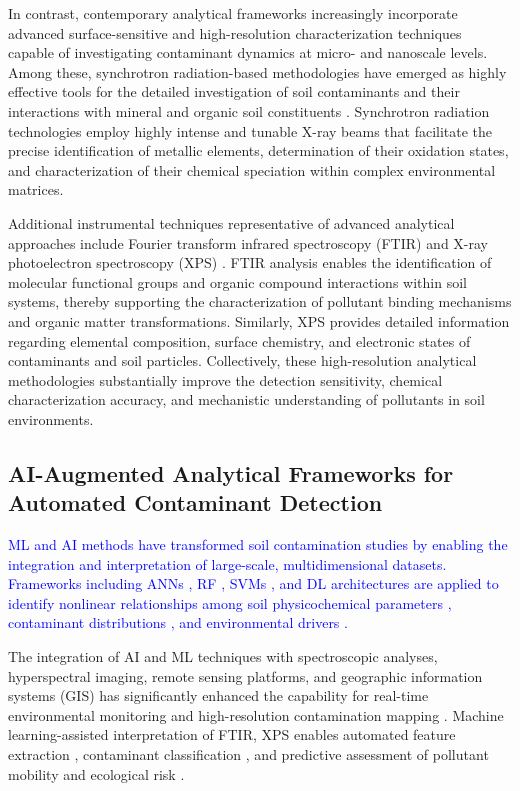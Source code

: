 \documentclass[environments,article,submit,pdftex,moreauthors]{Definitions/mdpi}
\begin{document}
In contrast, contemporary analytical frameworks increasingly incorporate
advanced surface-sensitive and high-resolution characterization techniques
capable of investigating contaminant dynamics at micro- and nanoscale levels.
Among these, synchrotron radiation-based methodologies have emerged as highly
effective tools for the detailed investigation of soil contaminants and their
interactions with mineral and organic soil constituents
\cite{Hu2020,Rosskopfova2012,LindhLemenkova2023a}. Synchrotron radiation
technologies employ highly intense and tunable X-ray beams that facilitate
the precise identification of metallic elements, determination of their
oxidation states, and characterization of their chemical speciation within
complex environmental matrices.

Additional instrumental techniques representative of advanced analytical
approaches include Fourier transform infrared spectroscopy (FTIR)
\cite{Xu2026} and X-ray photoelectron spectroscopy (XPS)
\cite{Guo2025,LindhLemenkova2023c}. FTIR analysis enables the identification
of molecular functional groups and organic compound interactions within soil
systems, thereby supporting the characterization of pollutant binding
mechanisms and organic matter transformations. Similarly, XPS provides
detailed information regarding elemental composition, surface chemistry, and
electronic states of contaminants and soil particles. Collectively, these
high-resolution analytical methodologies substantially improve the detection
sensitivity, chemical characterization accuracy, and mechanistic understanding
of pollutants in soil environments.

\subsection{AI-Augmented Analytical Frameworks for Automated Contaminant
    Detection}\label{sec3.2}

\textcolor{blue}{ML and AI methods have transformed soil contamination studies by enabling the integration and interpretation of large-scale, multidimensional datasets. Frameworks including ANNs \cite{Anifowose2024}, RF \cite{Shaheen2018,Foronda2023}, SVMs \cite{Gholizadeh2020}, and DL architectures \cite{Hu2024} are applied to identify nonlinear relationships among soil physicochemical parameters \cite{Aljanabi2025}, contaminant distributions \cite{Shaheen2018}, and environmental drivers \cite{Gholizadeh2020}.}

The integration of AI and ML techniques with spectroscopic analyses,
hyperspectral imaging, remote sensing platforms, and geographic information
systems (GIS) has significantly enhanced the capability for real-time
environmental monitoring and high-resolution contamination mapping
\cite{Hu2024}. Machine learning-assisted
interpretation of FTIR, XPS enables automated feature extraction \cite{Canero,Yacomelo}, contaminant classification \cite{Agyeman2022,Hu2024}, and predictive assessment of
pollutant mobility and ecological risk
\cite{Shaheen2018,Anifowose2024,Foronda2023}.
\end{document}
